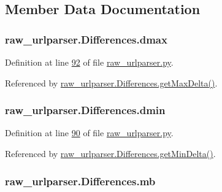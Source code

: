\subsection{Member Data Documentation}
\subsubsection[{\texorpdfstring{dmax}{dmax}}]{\setlength{\rightskip}{0pt plus 5cm}raw\+\_\+urlparser.\+Differences.\+dmax}\hypertarget{classraw__urlparser_1_1_differences_ad2b06158b655136bc7743dc6ac8d1e2a}{}\label{classraw__urlparser_1_1_differences_ad2b06158b655136bc7743dc6ac8d1e2a}


Definition at line \hyperlink{raw__urlparser_8py_source_l00092}{92} of file \hyperlink{raw__urlparser_8py_source}{raw\+\_\+urlparser.\+py}.



Referenced by \hyperlink{raw__urlparser_8py_source_l00097}{raw\+\_\+urlparser.\+Differences.\+get\+Max\+Delta()}.

\subsubsection[{\texorpdfstring{dmin}{dmin}}]{\setlength{\rightskip}{0pt plus 5cm}raw\+\_\+urlparser.\+Differences.\+dmin}\hypertarget{classraw__urlparser_1_1_differences_af8457a8e542de086595e7fbbffdf713c}{}\label{classraw__urlparser_1_1_differences_af8457a8e542de086595e7fbbffdf713c}


Definition at line \hyperlink{raw__urlparser_8py_source_l00090}{90} of file \hyperlink{raw__urlparser_8py_source}{raw\+\_\+urlparser.\+py}.



Referenced by \hyperlink{raw__urlparser_8py_source_l00094}{raw\+\_\+urlparser.\+Differences.\+get\+Min\+Delta()}.

\subsubsection[{\texorpdfstring{mb}{mb}}]{\setlength{\rightskip}{0pt plus 5cm}raw\+\_\+urlparser.\+Differences.\+mb}\hypertarget{classraw__urlparser_1_1_differences_ab4c3073b8c569b7791ab3b8e21e9b364}{}\label{classraw__urlparser_1_1_differences_ab4c3073b8c569b7791ab3b8e21e9b364}


